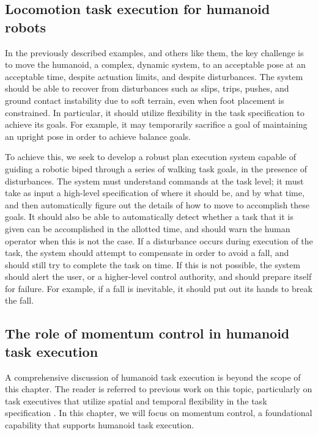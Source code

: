 \documentclass{llncs}
\begin{document}
\subsection{Locomotion task execution for humanoid robots}

In the previously described examples, and others like them, the key challenge is to move the humanoid,
a complex, dynamic system, to an acceptable pose at an acceptable time, despite actuation limits, and despite disturbances.
The system should be able to recover from disturbances such as slips, trips, pushes, and ground contact instability due to soft terrain, 
even when foot placement is constrained.  
In particular, it should utilize flexibility in the task specification to achieve its goals.
For example, it may temporarily sacrifice a goal of maintaining an upright pose in order to achieve balance goals.

To achieve this, we seek to develop a robust plan execution system capable of guiding a robotic biped through a series of walking task goals, in the presence of disturbances.  
The system must understand commands at the task level;  it must take as input a high-level specification of where it should be, and by what time, and then 
automatically figure out the details of how to move to accomplish these goals.  
It should also be able to automatically detect whether a task that it is given can be accomplished in the allotted time, and should warn the human operator 
when this is not the case.  
If a disturbance occurs during execution of the task, the system should attempt to compensate in order to avoid a fall, and should still try to 
complete the task on time.  
If this is not possible, the system should alert the user, or a higher-level control authority, and should prepare itself for failure.
For example, if a fall is inevitable, it should put out its hands to break the fall.



\subsection{The role of momentum control in humanoid task execution}

A comprehensive discussion of humanoid task execution is beyond the scope of this chapter.
The reader is referred to previous work on this topic, particularly on task executives that utilize
spatial and temporal flexibility in the task specification \cite{hofmann2015temporally, hofmann2006exploiting}.
In this chapter, we will focus on momentum control, a foundational capability that supports
humanoid task execution.
\end{document}
